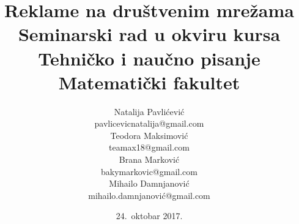 \documentclass[a4paper]{article}
\begin{document}
	\title{Reklame na društvenim mrežama\\ \small{Seminarski rad u okviru kursa\\Tehničko i naučno pisanje\\ Matematički fakultet}}
	
	\author{Natalija Pavlićević\\ pavlicevicnatalija@gmail.com\\ Teodora Maksimović\\ teamax18@gmail.com\\ Brana Marković\\ bakymarkovic@gmail.com\\ Mihailo Damnjanović\\ mihailo.damnjanović@gmail.com}
	\date{24.~oktobar 2017.}
	
	
\end{document}
